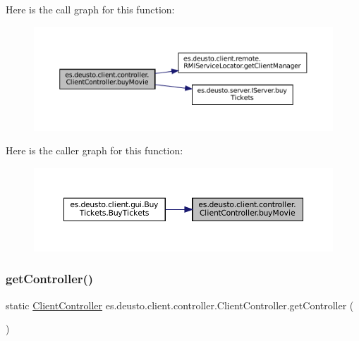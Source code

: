 Here is the call graph for this function\+:
\nopagebreak
\begin{figure}[H]
\begin{center}
\leavevmode
\includegraphics[width=350pt]{classes_1_1deusto_1_1client_1_1controller_1_1_client_controller_a92f0a66750a4f02c11de68814bc0d96f_cgraph}
\end{center}
\end{figure}
Here is the caller graph for this function\+:
\nopagebreak
\begin{figure}[H]
\begin{center}
\leavevmode
\includegraphics[width=350pt]{classes_1_1deusto_1_1client_1_1controller_1_1_client_controller_a92f0a66750a4f02c11de68814bc0d96f_icgraph}
\end{center}
\end{figure}
\mbox{\label{classes_1_1deusto_1_1client_1_1controller_1_1_client_controller_aa76786bb097da98592adb6aeefa8d996}} 
\subsubsection{\texorpdfstring{getController()}{getController()}}
{\footnotesize\ttfamily static \mbox{\hyperlink{classes_1_1deusto_1_1client_1_1controller_1_1_client_controller}{Client\+Controller}} es.\+deusto.\+client.\+controller.\+Client\+Controller.\+get\+Controller (\begin{DoxyParamCaption}{ }\end{DoxyParamCaption})\hspace{0.3cm}{\ttfamily [static]}}



